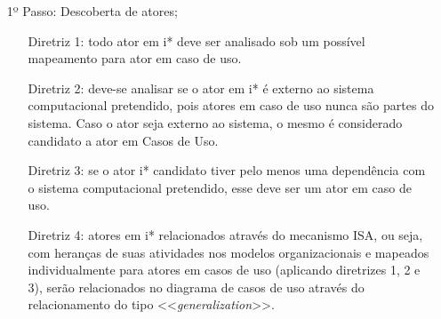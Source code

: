             \begin{enumerate}
                \item[1º Passo:] Descoberta de atores;
                \begin{enumerate}
                    \item[Diretriz 1:] todo ator em i* deve ser analisado sob um possível mapeamento para ator em caso de uso.
                    \item[Diretriz 2:] deve-se analisar se o ator em i* é externo ao sistema computacional pretendido, pois atores em caso de uso nunca são partes do sistema. Caso o ator seja externo ao sistema, o mesmo é considerado candidato a ator em Casos de Uso.
                    \item[Diretriz 3:] se o ator i* candidato tiver pelo menos uma dependência com o sistema computacional pretendido, esse deve ser um ator em caso de uso.
                    \item[Diretriz 4:] atores em i* relacionados através do mecanismo ISA, ou seja, com heranças de suas atividades nos modelos organizacionais e mapeados individualmente para atores em casos de uso (aplicando diretrizes 1, 2 e 3), serão relacionados no diagrama  de casos de uso através do relacionamento do tipo <<\emph{generalization}>>.
                \end{enumerate}


\end{enumerate}
